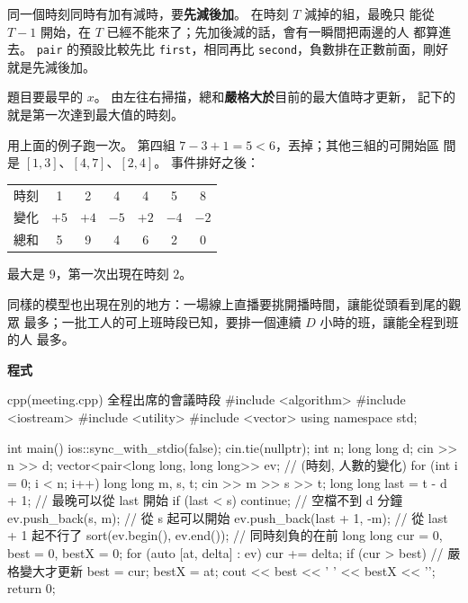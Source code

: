 同一個時刻同時有加有減時，要\textbf{先減後加}。 在時刻 $T$ 減掉的組，最晚只
能從 $T - 1$ 開始，在 $T$ 已經不能來了；先加後減的話，會有一瞬間把兩邊的人
都算進去。 \texttt{pair} 的預設比較先比 \texttt{first}，相同再比
\texttt{second}，負數排在正數前面，剛好就是先減後加。

題目要最早的 $x$。 由左往右掃描，總和\textbf{嚴格大於}目前的最大值時才更新，
記下的就是第一次達到最大值的時刻。

用上面的例子跑一次。 第四組 $7 - 3 + 1 = 5 < 6$，丟掉；其他三組的可開始區
間是 $[1, 3]$、$[4, 7]$、$[2, 4]$。 事件排好之後：

\begin{center}
\begin{tabular}{ccccccc}
\toprule
時刻 & 1 & 2 & 4 & 4 & 5 & 8 \\
變化 & $+5$ & $+4$ & $-5$ & $+2$ & $-4$ & $-2$ \\
總和 & 5 & 9 & 4 & 6 & 2 & 0 \\
\bottomrule
\end{tabular}
\end{center}

最大是 $9$，第一次出現在時刻 $2$。

同樣的模型也出現在別的地方：一場線上直播要挑開播時間，讓能從頭看到尾的觀眾
最多；一批工人的可上班時段已知，要排一個連續 $D$ 小時的班，讓能全程到班的人
最多。

\textbf{程式}

\begin{example}[label=ex:meeting]{cpp}{(meeting.cpp) 全程出席的會議時段}
#include <algorithm>
#include <iostream>
#include <utility>
#include <vector>
using namespace std;

int main() {
    ios::sync_with_stdio(false);
    cin.tie(nullptr);
    int n;
    long long d;
    cin >> n >> d;
    vector<pair<long long, long long>> ev;   // (時刻, 人數的變化)
    for (int i = 0; i < n; i++) {
        long long m, s, t;
        cin >> m >> s >> t;
        long long last = t - d + 1;          // 最晚可以從 last 開始
        if (last < s) {
            continue;                        // 空檔不到 d 分鐘
        }
        ev.push_back({s, m});                // 從 s 起可以開始
        ev.push_back({last + 1, -m});        // 從 last + 1 起不行了
    }
    sort(ev.begin(), ev.end());              // 同時刻負的在前
    long long cur = 0, best = 0, bestX = 0;
    for (auto [at, delta] : ev) {
        cur += delta;
        if (cur > best) {                    // 嚴格變大才更新
            best = cur;
            bestX = at;
        }
    }
    cout << best << ' ' << bestX << '\n';
    return 0;
}
\end{example}

